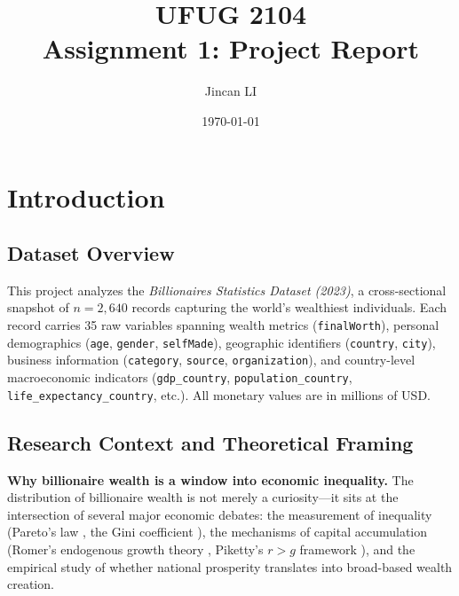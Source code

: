 \documentclass[a4paper,10pt]{article}
\begin{document}
\title{UFUG 2104 \\[4pt] Assignment 1: Project Report}
\author{Jincan LI}
\date{\today}
\maketitle

\section{Introduction}\label{sec:intro}

\subsection{Dataset Overview}
This project analyzes the \textit{Billionaires Statistics Dataset (2023)}, a cross-sectional snapshot of $n=2{,}640$ records capturing the world's wealthiest individuals.
Each record carries 35 raw variables spanning wealth metrics (\texttt{finalWorth}), personal demographics (\texttt{age}, \texttt{gender}, \texttt{selfMade}), geographic identifiers (\texttt{country}, \texttt{city}), business information (\texttt{category}, \texttt{source}, \texttt{organization}), and country-level macroeconomic indicators (\texttt{gdp\_country}, \texttt{population\_country}, \texttt{life\_expectancy\_country}, etc.).
All monetary values are in millions of USD.

\subsection{Research Context and Theoretical Framing}

\textbf{Why billionaire wealth is a window into economic inequality.}
The distribution of billionaire wealth is not merely a curiosity---it sits at the intersection of several major economic debates: the measurement of inequality (Pareto's law \cite{pareto1896}, the Gini coefficient \cite{cowell2011}), the mechanisms of capital accumulation (Romer's endogenous growth theory \cite{romer1990}, Piketty's $r>g$ framework \cite{piketty2014}), and the empirical study of whether national prosperity translates into broad-based wealth creation.
\end{document}
